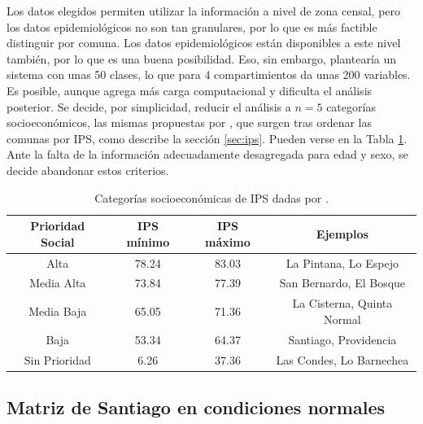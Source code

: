 Los datos elegidos permiten utilizar la información a nivel de zona censal, pero los datos epidemiológicos no son tan granulares, por lo que es más factible distinguir por comuna. Los datos epidemiológicos están disponibles a este nivel también, por lo que es una buena posibilidad. Eso, sin embargo, plantearía un sistema con unas 50 clases, lo que para 4 compartimientos da unas 200 variables. Es posible, aunque agrega más carga computacional y dificulta el análisis posterior. Se decide, por simplicidad, reducir el análisis a \(n = 5\) categorías socioeconómicos, las mismas propuestas por \cite{SEREMIRM2019}, que surgen tras ordenar las comunas por IPS, como describe la sección \ref{sec:ips}. Pueden verse en la Tabla \ref{table:ips-categ}. Ante la falta de la información adecuadamente desagregada para edad y sexo, se decide abandonar estos criterios.

\begin{table}[h!]
\centering
\begin{tabular}{||c | c | c | c||} 
 \hline
 \textbf{Prioridad Social} & \textbf{IPS mínimo} & \textbf{IPS máximo} & \textbf{Ejemplos} \\ [0.5ex] 
 \hline
 Alta & 78.24 & 83.03 & La Pintana, Lo Espejo\\ 
 Media Alta & 73.84 & 77.39 & San Bernardo, El Bosque\\
 Media Baja & 65.05 & 71.36 & La Cisterna, Quinta Normal\\
 Baja & 53.34 & 64.37 & Santiago, Providencia\\
 Sin Prioridad & 6.26 & 37.36 & Las Condes, Lo Barnechea\\ [1ex] 
 \hline
\end{tabular}
\caption{Categorías socioeconómicas de IPS dadas por \cite{SEREMIRM2019}.}
\label{table:ips-categ}
\end{table}

\subsection{Matriz de Santiago en condiciones normales} \label{subsec:santiago-normal-eod}

